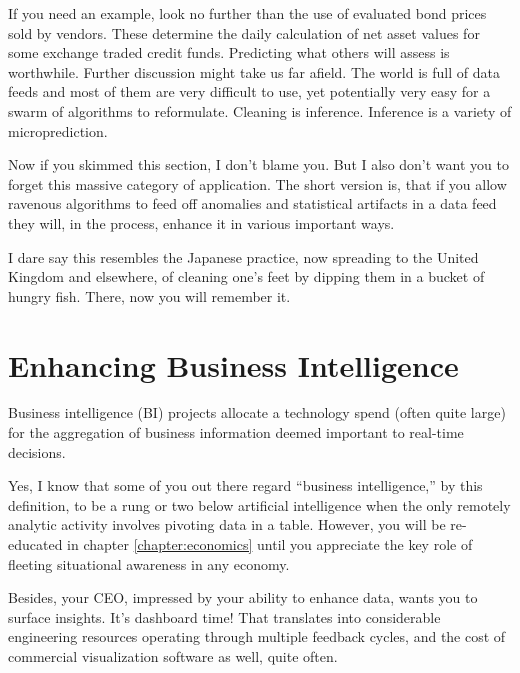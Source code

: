 If you need an example, look no further than the use of evaluated bond prices sold by vendors. These determine the daily calculation of net asset values for some exchange traded credit funds. Predicting what others will assess is worthwhile. Further discussion might take us far afield. The world is full of data feeds and most of them are very difficult to use, yet potentially very easy for a swarm of algorithms to reformulate. Cleaning is inference. Inference is a variety of microprediction. 

Now if you skimmed this section, I don't blame you. But I also don't want you to forget this massive category of application. The short version is, that if you allow ravenous algorithms to feed off anomalies and statistical artifacts in a data feed they will, in the process, enhance it in various important ways. 

I dare say this resembles the Japanese practice, now spreading to the United Kingdom and elsewhere, of cleaning one's feet by dipping them in a bucket of hungry fish. There, now you will remember it.  



\section{Enhancing Business Intelligence}
\label{sec:dashboard}


Business intelligence (BI) projects allocate a technology spend (often quite large) for the aggregation of business information deemed important to real-time decisions.   

Yes, I know that some of you out there regard ``business intelligence,'' by this definition, to be a rung or two below artificial intelligence when the only remotely analytic activity involves pivoting data in a table. However, you will be re-educated in chapter \ref{chapter:economics} until you appreciate the key role of fleeting situational awareness in any economy. 

Besides, your CEO, impressed by your ability to enhance data, wants you to surface insights. It's dashboard time! That translates into considerable engineering resources operating through multiple feedback cycles, and the cost of commercial visualization software as well, quite often. 

